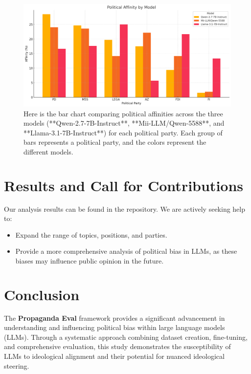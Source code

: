 \documentclass[10pt]{article}
\begin{document}
\begin{figure}[h!]
    \centering
    \includegraphics[width=\textwidth]{political_affinity.png}
    \caption{Here is the bar chart comparing political affinities across the three models (**Qwen-2.7-7B-Instruct**, **Mii-LLM/Qwen-5588**, and **Llama-3.1-7B-Instruct**) for each political party. Each group of bars represents a political party, and the colors represent the different models.}
    \label{fig:political_affinity}
\end{figure}

\section*{Results and Call for Contributions}

Our analysis results can be found in the repository. We are actively seeking help to:
\begin{itemize}
    \item Expand the range of topics, positions, and parties.
    \item Provide a more comprehensive analysis of political bias in LLMs, as these biases may influence public opinion in the future.
\end{itemize}

\section*{Conclusion}

The \textbf{Propaganda Eval} framework provides a significant advancement in understanding and influencing political bias within large language models (LLMs). Through a systematic approach combining dataset creation, fine-tuning, and comprehensive evaluation, this study demonstrates the susceptibility of LLMs to ideological alignment and their potential for nuanced ideological steering. 
\end{document}
